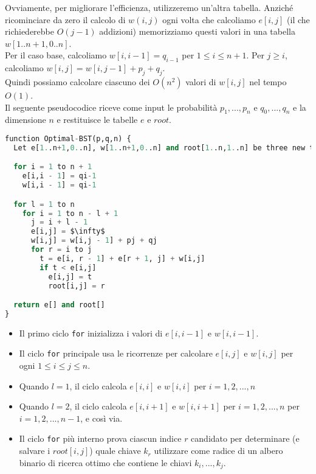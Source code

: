 Ovviamente, per migliorare l'efficienza, utilizzeremo un'altra tabella.
Anziché ricominciare da zero il calcolo di $w(i,j)$ ogni volta che
calcoliamo $e[i,j]$ (il che richiederebbe $O(j-1)$ addizioni)
memorizziamo questi valori in una tabella $w[1..n+1,0..n]$.\\
Per il caso base, calcoliamo $w[i, i-1] = q_{i-1}$ per $1 \le i \le n+1$.
Per $j \ge i$, calcoliamo $w[i,j] = w[i, j-1] + p_j + q_j$.\\

Quindi possiamo calcolare ciascuno dei $O(n^2)$ valori di $w[i,j]$
nel tempo $O(1)$.\\

Il seguente pseudocodice riceve come input le probabilità
$p_1, ..., p_n$ e $q_0, ..., q_n$ e la dimensione $n$ e
restituisce le tabelle $e$ e $root$.

\begin{lstlisting}[language=Python, mathescape=true]
function Optimal-BST(p,q,n) {
  Let e[1..n+1,0..n], w[1..n+1,0..n] and root[1..n,1..n] be three new table

  for i = 1 to n + 1
    e[i,i - 1] = qi-1
    w[i,i - 1] = qi-1

  for l = 1 to n
    for i = 1 to n - l + 1
      j = i + l - 1
      e[i,j] = $\infty$
      w[i,j] = w[i,j - 1] + pj + qj
      for r = i to j
        t = e[i, r - 1] + e[r + 1, j] + w[i,j]
        if t < e[i,j]
          e[i,j] = t
          root[i,j] = r

  return e[] and root[]
}
\end{lstlisting}


\begin{itemize}
  \item
        Il primo ciclo \texttt{for} inizializza i valori di $e[i,i - 1]$ e
        $w[i,i - 1]$.
  \item
        Il ciclo \texttt{for} principale usa le ricorrenze per calcolare
        $e[i,j]$ e $w[i,j]$ per ogni $1 \le i \le j \le n$.
  \item
        Quando $l = 1$, il ciclo calcola $e[i,i]$ e $w[i,i]$ per
        $i = 1, 2, ..., n$
  \item
        Quando $l = 2$, il ciclo calcola $e[i,i+1]$ e $w[i,i+1]$ per
        $i = 1, 2, ..., n$ per $i = 1, 2, ..., n-1$, e così via.
  \item
        Il ciclo \texttt{for} più interno prova ciascun indice $r$ candidato per
        determinare (e salvare i $root[i,j]$) quale chiave $k_r$
        utilizzare come radice di un albero binario di ricerca ottimo che
        contiene le chiavi $k_i, ..., k_j$.
\end{itemize}


